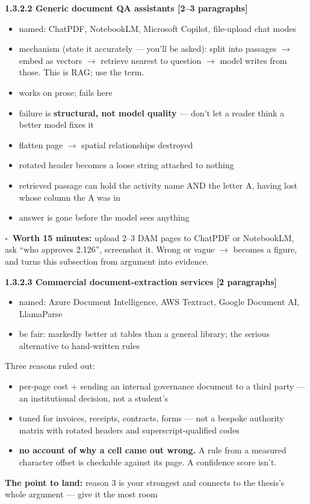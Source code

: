 \documentclass[11pt,a4paper]{article}
\newcommand{\turn}[1]{\par\vspace{3pt}\noindent\textbf{The point to land:} #1\par}
\newcommand{\len}[1]{\hfill\textcolor{gr}{\small[#1]}}
\newcommand{\todo}{$\square$~}
\begin{document}
\textbf{1.3.2.2 Generic document QA assistants \len{2--3 paragraphs}}
\begin{itemize}
\item named: ChatPDF, NotebookLM, Microsoft Copilot, file-upload chat modes
\item mechanism (state it accurately --- you'll be asked): split into passages
$\rightarrow$ embed as vectors $\rightarrow$ retrieve nearest to question
$\rightarrow$ model writes from those. This is RAG; use the term.
\item works on prose; fails here
\item failure is \textbf{structural, not model quality} --- don't let a reader think
a better model fixes it
\item flatten page $\rightarrow$ spatial relationships destroyed
\item rotated header becomes a loose string attached to nothing
\item retrieved passage can hold the activity name AND the letter A, having lost
whose column the A was in
\item answer is gone before the model sees anything
\end{itemize}
\textbf{\todo Worth 15 minutes:} upload 2--3 DAM pages to ChatPDF or NotebookLM,
ask ``who approves 2.126'', screenshot it. Wrong or vague $\rightarrow$ becomes a
figure, and turns this subsection from argument into evidence.

\textbf{1.3.2.3 Commercial document-extraction services \len{2 paragraphs}}
\begin{itemize}
\item named: Azure Document Intelligence, AWS Textract, Google Document AI, LlamaParse
\item be fair: markedly better at tables than a general library; the serious alternative
to hand-written rules
\end{itemize}
Three reasons ruled out:
\begin{itemize}
\item[1.] per-page cost + sending an internal governance document to a third party
--- an institutional decision, not a student's
\item[2.] tuned for invoices, receipts, contracts, forms --- not a bespoke authority
matrix with rotated headers and superscript-qualified codes
\item[3.] \textbf{no account of why a cell came out wrong.} A rule from a measured
character offset is checkable against its page. A confidence score isn't.
\end{itemize}
\turn{reason 3 is your strongest and connects to the thesis's whole argument --- give it the most room}
\end{document}
